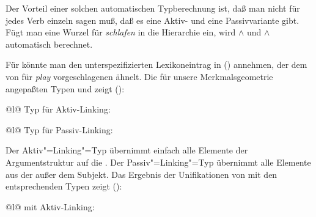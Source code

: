 Der Vorteil einer solchen automatischen Typberechnung ist, daß man nicht
für jedes Verb einzeln sagen muß, daß es eine Aktiv- und eine Passivvariante
gibt. Fügt man \zb eine Wurzel für \emph{schlafen} in die Hierarchie ein, wird
 $\wedge$  und  $\wedge$ 
automatisch berechnet.

\noindent
Für  könnte man den unterspezifizierten Lexikoneintrag in ()
annehmen, der dem von \citet[]{Koenig99a} für \emph{play} vorgeschlagenen ähnelt.
\ea
{}
\z
Die für unsere Merkmalsgeometrie angepaßten Typen  und  zeigt ():
\eal
\ex 
\begin{tabular}[t]{@{}l@{}}
Typ für Aktiv-Linking:\\
\end{tabular}
\ex\label{constr-passive-linking}
\begin{tabular}[t]{@{}l@{}} 
Typ für Passiv-Linking:\\
\end{tabular}
\zl
Der Aktiv"=Linking"=Typ übernimmt einfach alle Elemente der Argumentstruktur auf die \subcatl.
Der Passiv"=Linking"=Typ übernimmt alle Elemente aus der \argstl außer dem Subjekt.
Das Ergebnis der Unifikationen von  mit den entsprechenden Typen zeigt ():
\eal
\ex 
\begin{tabular}[t]{@{}l@{}}
 mit Aktiv-Linking:\\
\end{tabular}
